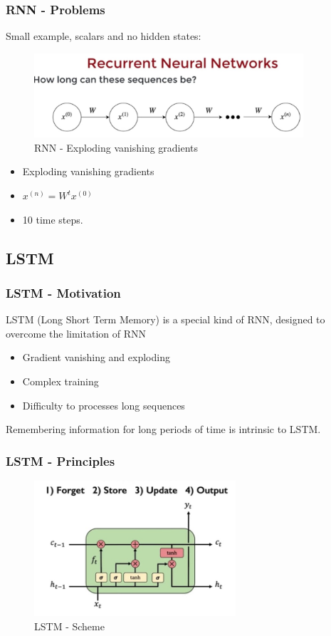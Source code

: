 \documentclass[12pt]{report}
\begin{document}
\subsubsection{RNN - Problems}

Small example, scalars and no hidden states:
\begin{figure}[H]\centering\includegraphics[width=10cm]{Explode.jpeg}\caption{RNN - Exploding vanishing gradients}\end{figure}

\begin{itemize}
	\item Exploding vanishing gradients
	\item $x^{(n)} = W^t x^{(0)}$
	\item 10 time steps.
\end{itemize}

\newpage
\subsection{LSTM}


\subsubsection{LSTM - Motivation}

LSTM (Long Short Term Memory) is a special kind of RNN,  designed to overcome the limitation of RNN
\begin{itemize}
	\item Gradient vanishing and exploding
	\item Complex training
	\item Difficulty to processes long sequences 
\end{itemize}

Remembering information for long periods of time is intrinsic to LSTM.

\subsubsection{LSTM - Principles}


\begin{figure}[H]\centering\includegraphics[width=7.5cm]{LSTM_MAIN.jpeg}\caption{LSTM - Scheme}\end{figure}
\end{document}
